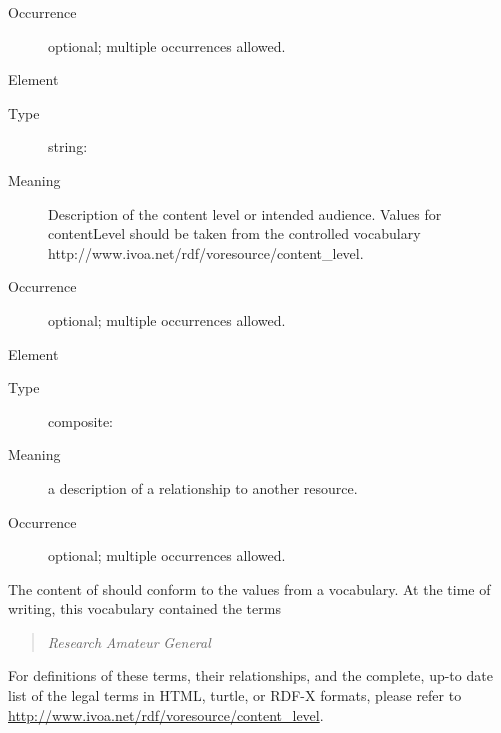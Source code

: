 \documentclass[11pt,a4paper]{ivoa}
\begin{document}
\begin{generated}
\begin{bigdescription}
\begin{description}
\item[Occurrence] optional; multiple occurrences allowed.

\end{description}
\item[Element \xmlel{contentLevel}]
\begin{description}
\item[Type] string: 
\item[Meaning] 
                Description of the content level or intended audience.
                Values for contentLevel should be taken from the controlled
                vocabulary
                http://www.ivoa.net/rdf/voresource/content\_level.
             
\item[Occurrence] optional; multiple occurrences allowed.

\end{description}
\item[Element \xmlel{relationship}]
\begin{description}
\item[Type] composite: 
\item[Meaning] 
               a description of a relationship to another resource.  
             
\item[Occurrence] optional; multiple occurrences allowed.

\end{description}


\end{bigdescription}\endgroup

\endgroup
\end{generated}


The content of  should conform to the values from a
vocabulary.  At the time of writing, this vocabulary contained the terms

\begin{quotation}\noindent
\textsl{Research}
\textsl{Amateur}
\textsl{General}

\end{quotation}

For definitions of these terms, their relationships, and the complete,
up-to date list of the legal terms in HTML, turtle, or RDF-X formats,
please refer to \url{http://www.ivoa.net/rdf/voresource/content_level}.
\end{document}
